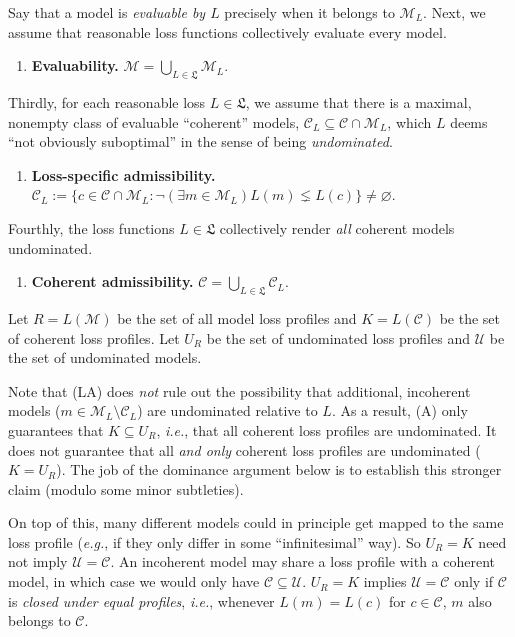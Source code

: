 \documentclass[11pt]{article}
\theoremstyle{definition}
\theoremstyle{remark}
\newcommand{\M}{\mathcal M}
\newcommand{\C}{\mathcal C}
\newcommand{\U}{\mathcal U}
\begin{document}
Say that a model is \emph{evaluable by $L$} precisely when it belongs to $\M_L$. Next, we assume that reasonable loss functions collectively evaluate every model.
\begin{enumerate}[label=\textbf{(E)},leftmargin=*]
\item \textbf{Evaluability.} $\M=\bigcup_{L\in\mathfrak L}\M_L$.
\end{enumerate}

Thirdly, for each reasonable loss $L\in\mathfrak L$, we assume that there is a maximal, nonempty class of evaluable ``coherent'' models, $\C_L\subseteq\C\cap\M_L$, which $L$ deems ``not obviously suboptimal'' in the sense of being \textit{undominated}. 

\begin{enumerate}[label=\textbf{(LA)},leftmargin=*]
\item \textbf{Loss-specific admissibility.} $\C_L:=\{c\in\C\cap\M_L : \neg(\exists m\in\M_L)L(m)\lneq L(c)\}\neq\varnothing$.
\end{enumerate}

Fourthly, the loss functions $L\in\mathfrak L$ collectively render \textit{all} coherent models undominated.


\begin{enumerate}[label=\textbf{(A)},leftmargin=*]
\item \textbf{Coherent admissibility.} $\C=\bigcup_{L\in\mathfrak L}\C_L$.
\end{enumerate}


Let $R=L(\M)$ be the set of all model loss profiles and $K=L(\C)$ be the set of coherent loss profiles. Let $U_R$ be the set of undominated loss profiles and $\U$ be the set of undominated models.


Note that (LA) does \textit{not} rule out the possibility that additional, incoherent models ($m\in\M_L\setminus\C_L$) are undominated relative to $L$. As a result, (A) only guarantees that $K\subseteq U_R$, \textit{i.e.}, that all coherent loss profiles are undominated. It does not guarantee that all \textit{and only} coherent loss profiles are undominated ($K=U_R$). The job of the dominance argument below is to establish this stronger claim (modulo some minor subtleties).




On top of this, many different models could in principle get mapped to the same loss profile (\textit{e.g.}, if they only differ in some ``infinitesimal'' way). So $U_R=K$ need not imply $\U=\C$. An incoherent model may share a loss profile with a coherent model, in which case we would only have $\C\subseteq \U$. $U_R=K$ implies $\U=\C$ only if $\C$ is \emph{closed under equal profiles}, \textit{i.e.}, whenever $L(m)=L(c)$ for $c\in\C$, $m$ also belongs to $\C$. 
\end{document}
